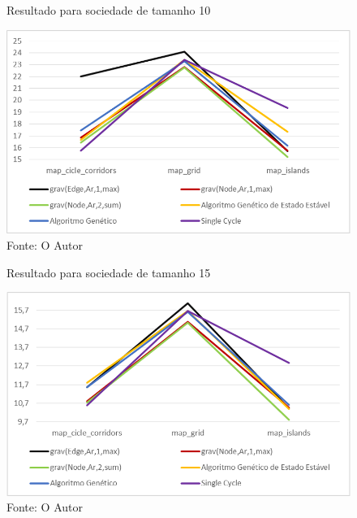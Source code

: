 \begin{figure}
	\caption[Resultado para sociedade de tamanho 10]{Resultado para sociedade 
		de tamanho 10}
	\centering
	\includegraphics[width=\columnwidth]{images/graph_agent3.png}
	\caption*{Fonte: O Autor}
	\label{fig:graph_agentes3}
\end{figure}

\begin{figure}
	\caption[Resultado para sociedade de tamanho 15]{Resultado para sociedade 
		de tamanho 15}
	\centering
	\includegraphics[width=\columnwidth]{images/graph_agent4.png}
	\caption*{Fonte: O Autor}
	\label{fig:graph_agentes4}
\end{figure}